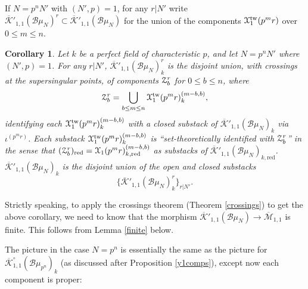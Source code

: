 \documentclass[11pt]{amsart}
\newtheorem{corollary}[subsection]{Corollary}
\theoremstyle{definition}
\begin{document}
If $N = p^nN'$ with $(N',p) = 1$, for any $r|N'$ write $\overline{\mathcal{K}}'_{1,1}({\mathcal{B}}\mu_N)^r \subset \overline{\mathcal{K}}'_{1,1}({\mathcal{B}}\mu_N)$ for the union of the components ${\mathbf{\EuScript{X}}}^{\mathrm{tw}}_1(p^mr)$ over $0 \leq m \leq n$. 

\begin{corollary}\label{twistedgamma1comps}
Let $k$ be a perfect field of characteristic $p$, and let $N = p^nN'$ where $(N',p) = 1$. For any $r|N'$, $\overline{\mathcal{K}}'_{1,1}({\mathcal{B}}\mu_N)^r_k$ is the disjoint union, with crossings at the supersingular points, of components ${\mathbf{\EuScript{Z}}}^r_b$ for $0 \leq b \leq n$, where 
\begin{displaymath}
{\mathbf{\EuScript{Z}}}_b^r = \bigcup_{b\leq m \leq n} {\mathbf{\EuScript{X}}}^{\mathrm{tw}}_1(p^mr)^{(m-b,b)}_k,
\end{displaymath}
identifying each ${\mathbf{\EuScript{X}}}^{\mathrm{tw}}_1(p^mr)^{(m-b,b)}_k$ with a closed substack of $\overline{\mathcal{K}}'_{1,1}({\mathcal{B}}\mu_N)_k$ via $\iota^{(p^mr)}$. Each substack ${\mathbf{\EuScript{X}}}^{\mathrm{tw}}_1(p^mr)^{(m-b,b)}_k$ is ``set-theoretically identified with ${\mathbf{\EuScript{Z}}}_b^r$'' in the sense that $({\mathbf{\EuScript{Z}}}^r_b)_{\mathrm{red}} = {\mathbf{\EuScript{X}}}_1(p^mr)^{(m-b,b)}_{k,\mathrm{red}}$ as substacks of $\overline{\mathcal{K}}'_{1,1}({\mathcal{B}}\mu_N)_{k,\mathrm{red}}$. $\overline{\mathcal{K}}'_{1,1}({\mathcal{B}}\mu_N)_k$ is the disjoint union of the open and closed substacks 
\begin{displaymath}
\{\overline{\mathcal{K}}'_{1,1}({\mathcal{B}}\mu_N)^r_k\}_{r|N'}.
\end{displaymath}
\end{corollary}

Strictly speaking, to apply the crossings theorem (Theorem \ref{crossings}) to get the above corollary, we need to know that the morphism $\overline{\mathcal{K}}'_{1,1}({\mathcal{B}}\mu_N) \rightarrow \overline{\mathcal{M}}_{1,1}$ is finite. This follows from Lemma \ref{finite} below.

The picture in the case $N = p^n$ is essentially the same as the picture for $\overline{\mathcal{K}}^\circ_{1,1}({\mathcal{B}}\mu_{p^n})_k$ (as discussed after Proposition \ref{y1comps}), except now each component is proper:
\end{document}
